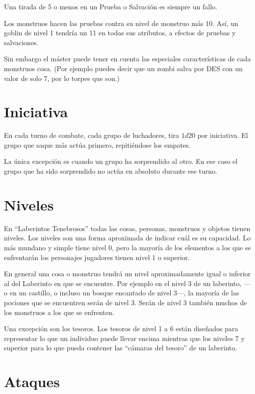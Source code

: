 \begin{multicols}{2}

Una tirada de 5 o menos en un Prueba o Salvación es siempre un fallo.


Los monstruos hacen las pruebas contra su nivel de monstruo más 10. Así, un
goblin de nivel 1 tendría un 11 en todas sus atributos, a efectos de pruebas y
salvaciones.

Sin embargo el máster puede tener en cuenta las especiales características de
cada monstruos cosa. (Por ejemplo puedes decir que un zombi salva por DES con un
valor de solo 7, por lo torpes que son.)

\section{Iniciativa}

En cada turno de combate, cada grupo de luchadores, tira $ 1d20$ por iniciativa. El
grupo que saque más actúa primero, repitiéndose los empates.

La única excepción es cuando un grupo ha sorprendido al otro. En ese caso el grupo
que ha sido sorprendido no actúa en absoluto durante ese turno.

\section{Niveles}

En \enquote{Laberintos Tenebrosos} todas las cosas, personas, monstruos y objetos
tienen niveles. Los niveles son una forma aproximada de indicar cuál es su capacidad.
Lo más mundano y simple tiene nivel 0, pero la mayoría de los
elementos a los que se enfrentarán los personajes jugadores tienen nivel 1 o superior.

En general una cosa o monstruo tendrá un nivel aproximadamente igual o inferior
al del Laberinto en que se encuentre. Por ejemplo en el nivel 3 de un laberinto,
---o en un castillo, o incluso un bosque encantado de nivel 3---, la mayoría de
las pociones que se encuentren serán de nivel 3. Serán de nivel 3 también muchos
de los monstruos a los que se enfrenten.

Una excepción son los tesoros. Los tesoros de nivel 1 a 6 están diseñados para
representar lo que un individuo puede llevar encima mientras que los niveles 7 y
superior para lo que pueda contener las \enquote{cámaras del tesoro} de un laberinto.

\section{Ataques}


\end{multicols}
